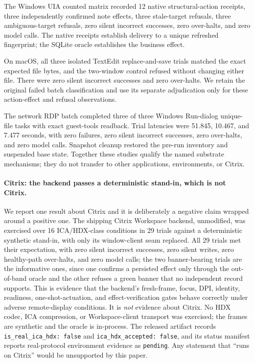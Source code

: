 The Windows UIA counted matrix recorded 12 native structural-action receipts,
three independently confirmed note effects, three stale-target refusals, three
ambiguous-target refusals, zero silent incorrect successes, zero over-halts, and
zero model calls. The native receipts establish delivery to a unique refreshed
fingerprint; the SQLite oracle establishes the business effect.

On macOS, all three isolated TextEdit replace-and-save trials matched the exact
expected file bytes, and the two-window control refused without changing either
file. There were zero silent incorrect successes and zero over-halts. We retain
the original failed batch classification and use its separate adjudication only
for these action-effect and refusal observations.

The network RDP batch completed three of three Windows Run-dialog unique-file
tasks with exact guest-tools readback. Trial latencies were 51.845, 10.467, and
7.477 seconds, with zero failures, zero silent incorrect successes, zero
over-halts, and zero model calls. Snapshot cleanup restored the pre-run inventory
and suspended base state. Together these studies qualify the named substrate
mechanisms; they do not transfer to other applications, environments, or Citrix.

\paragraph{Citrix: the backend passes a deterministic stand-in, which is not
Citrix.} We report one result about Citrix and it is deliberately a negative
claim wrapped around a positive one. The shipping Citrix Workspace backend,
unmodified, was exercised over 16 ICA/HDX-class conditions in 29 trials against
a deterministic synthetic stand-in, with only its window-client seam replaced.
All 29 trials met their expectation, with zero silent incorrect successes, zero
silent writes, zero healthy-path over-halts, and zero model calls; the two
banner-bearing trials are the informative ones, since one confirms a persisted
effect only through the out-of-band oracle and the other refuses a green banner
that no independent record supports. This is evidence that the backend's
fresh-frame, focus, DPI, identity, readiness, one-shot-actuation, and
effect-verification gates behave correctly under adverse remote-display
conditions. It is \emph{not} evidence about Citrix. No HDX codec, ICA
compression, or Workspace-client transport was exercised; the frames are
synthetic and the oracle is in-process. The released artifact records
\texttt{is\_real\_ica\_hdx: false} and \texttt{ica\_hdx\_accepted: false}, and
its status manifest reports real-protocol environment evidence as
\texttt{pending}. Any statement that \system{} ``runs on Citrix'' would be
unsupported by this paper.
